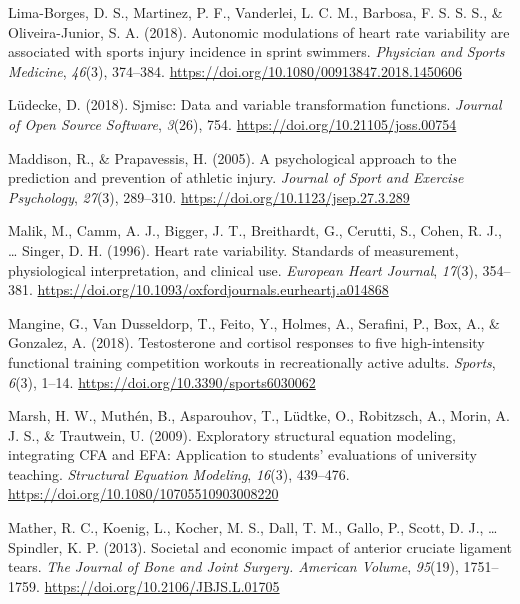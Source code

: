 \documentclass[
  english,
  man,floatsintext]{apa6}
\begin{document}
\leavevmode\hypertarget{ref-Lima-Borges2018}{}%
Lima-Borges, D. S., Martinez, P. F., Vanderlei, L. C. M., Barbosa, F. S. S. S., \& Oliveira-Junior, S. A. (2018). Autonomic modulations of heart rate variability are associated with sports injury incidence in sprint swimmers. \emph{Physician and Sports Medicine}, \emph{46}(3), 374--384. \url{https://doi.org/10.1080/00913847.2018.1450606}

\leavevmode\hypertarget{ref-R-sjmisc}{}%
Lüdecke, D. (2018). Sjmisc: Data and variable transformation functions. \emph{Journal of Open Source Software}, \emph{3}(26), 754. \url{https://doi.org/10.21105/joss.00754}

\leavevmode\hypertarget{ref-Maddison2005}{}%
Maddison, R., \& Prapavessis, H. (2005). A psychological approach to the prediction and prevention of athletic injury. \emph{Journal of Sport and Exercise Psychology}, \emph{27}(3), 289--310. \url{https://doi.org/10.1123/jsep.27.3.289}

\leavevmode\hypertarget{ref-Malik1996}{}%
Malik, M., Camm, A. J., Bigger, J. T., Breithardt, G., Cerutti, S., Cohen, R. J., \ldots{} Singer, D. H. (1996). Heart rate variability. Standards of measurement, physiological interpretation, and clinical use. \emph{European Heart Journal}, \emph{17}(3), 354--381. \url{https://doi.org/10.1093/oxfordjournals.eurheartj.a014868}

\leavevmode\hypertarget{ref-Mangine2018}{}%
Mangine, G., Van Dusseldorp, T., Feito, Y., Holmes, A., Serafini, P., Box, A., \& Gonzalez, A. (2018). Testosterone and cortisol responses to five high-intensity functional training competition workouts in recreationally active adults. \emph{Sports}, \emph{6}(3), 1--14. \url{https://doi.org/10.3390/sports6030062}

\leavevmode\hypertarget{ref-Marsh2009}{}%
Marsh, H. W., Muthén, B., Asparouhov, T., Lüdtke, O., Robitzsch, A., Morin, A. J. S., \& Trautwein, U. (2009). Exploratory structural equation modeling, integrating CFA and EFA: Application to students' evaluations of university teaching. \emph{Structural Equation Modeling}, \emph{16}(3), 439--476. \url{https://doi.org/10.1080/10705510903008220}

\leavevmode\hypertarget{ref-Mather2013}{}%
Mather, R. C., Koenig, L., Kocher, M. S., Dall, T. M., Gallo, P., Scott, D. J., \ldots{} Spindler, K. P. (2013). Societal and economic impact of anterior cruciate ligament tears. \emph{The Journal of Bone and Joint Surgery. American Volume}, \emph{95}(19), 1751--1759. \url{https://doi.org/10.2106/JBJS.L.01705}
\end{document}

